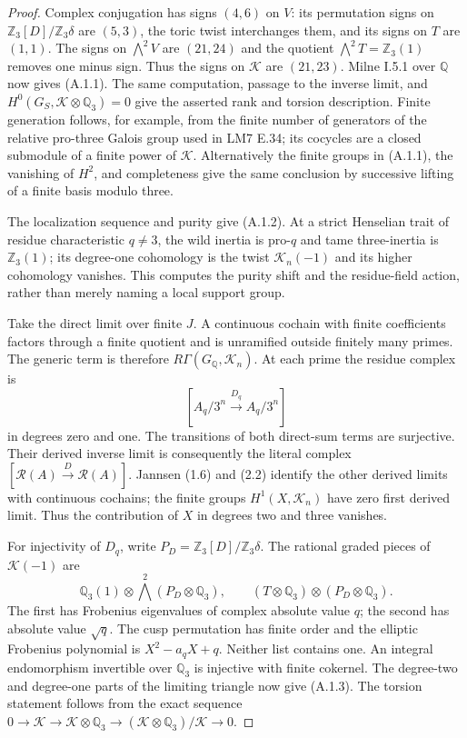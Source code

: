 \begin{proof}
Complex conjugation has signs $(4,6)$ on $V$: its permutation signs
on $\mathbb Z_3[D]/\mathbb Z_3\delta$ are $(5,3)$, the toric twist
interchanges them, and its signs on $T$ are $(1,1)$. The signs on
$\bigwedge^2V$ are $(21,24)$ and the quotient
$\bigwedge^2T=\mathbb Z_3(1)$ removes one minus sign. Thus the signs
on $\mathcal K$ are $(21,23)$. Milne I.5.1 over $\mathbb Q$ now gives
(A.1.1). The same computation, passage to the inverse limit, and
$H^0(G_S,\mathcal K\otimes\mathbb Q_3)=0$ give the asserted rank and
torsion description. Finite generation follows, for example, from
the finite number of generators of the relative pro-three Galois
group used in LM7 E.34; its cocycles are a closed submodule of a
finite power of $\mathcal K$. Alternatively the finite groups in
(A.1.1), the vanishing of $H^2$, and completeness give the same
conclusion by successive lifting of a finite basis modulo three.

The localization sequence and purity give (A.1.2). At a strict
Henselian trait of residue characteristic $q\ne3$, the wild inertia
is pro-$q$ and tame three-inertia is $\mathbb Z_3(1)$; its degree-one
cohomology is the twist $\mathcal K_n(-1)$ and its higher cohomology
vanishes. This computes the purity shift and the residue-field
action, rather than merely naming a local support group.

Take the direct limit over finite $J$. A continuous cochain with
finite coefficients factors through a finite quotient and is
unramified outside finitely many primes. The generic term is
therefore $R\Gamma(G_{\mathbb Q},\mathcal K_n)$. At each prime the
residue complex is
\[
 [A_q/3^n\xrightarrow{D_q}A_q/3^n]
\]
in degrees zero and one. The transitions of both direct-sum terms
are surjective. Their derived inverse limit is consequently the
literal complex $[\mathcal R(A)\xrightarrow D\mathcal R(A)]$.
Jannsen (1.6) and (2.2) \cite{Jannsen1988} identify the other derived limits with
continuous cochains; the finite groups $H^1(X,\mathcal K_n)$ have
zero first derived limit. Thus the contribution of $X$ in degrees
two and three vanishes.

For injectivity of $D_q$, write $P_D=\mathbb Z_3[D]/\mathbb Z_3\delta$.
The rational graded pieces of $\mathcal K(-1)$ are
\[
 \mathbb Q_3(1)\otimes\bigwedge^2(P_D\otimes\mathbb Q_3),
 \qquad (T\otimes\mathbb Q_3)\otimes(P_D\otimes\mathbb Q_3).
\]
The first has Frobenius eigenvalues of complex absolute value $q$;
the second has absolute value $\sqrt q$. The cusp permutation has
finite order and the elliptic Frobenius polynomial is
$X^2-a_qX+q$. Neither list contains one. An integral endomorphism
invertible over $\mathbb Q_3$ is injective with finite cokernel.
The degree-two and degree-one parts of the limiting triangle now
give (A.1.3). The torsion statement follows from the exact sequence
$0\to\mathcal K\to\mathcal K\otimes\mathbb Q_3\to
(\mathcal K\otimes\mathbb Q_3)/\mathcal K\to0$.
\end{proof}

